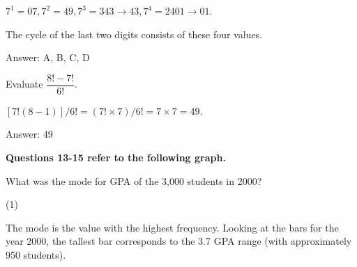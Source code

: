 \documentclass[11pt,paper=a4,answers]{exam}
\begin{document}
\begin{questions}
\begin{solution}
\begin{center}
$7^1=07, 7^2=49, 7^3=343 \to 43, 7^4=2401 \to 01$.
\end{center}
The cycle of the last two digits consists of these four values.

Answer: \colorbox{yellow!100}{A, B, C, D}
\end{solution}

\vspace{1cm}


\question
Evaluate $\dfrac{8! - 7!}{6!}$.

\begin{solution}
\begin{center}
$[7!(8-1)] / 6! = (7! \times 7) / 6! = 7 \times 7 = 49$.
\end{center}

Answer: \colorbox{yellow!100}{49}
\end{solution}

\vspace{1cm}

\textbf{Questions 13-15 refer to the following graph.}
\vspace{5pt}


\begin{center}
\end{center}

\question
What was the mode for GPA of the 3,000 students in 2000?

\begin{tasks}(1)
    
\end{tasks}

\begin{solution}
The mode is the value with the highest frequency.
\vspace{5pt}
Looking at the bars for the year 2000, the tallest bar corresponds to the 3.7 GPA range (with approximately 950 students).


\end{solution}
\end{questions}
\end{document}
